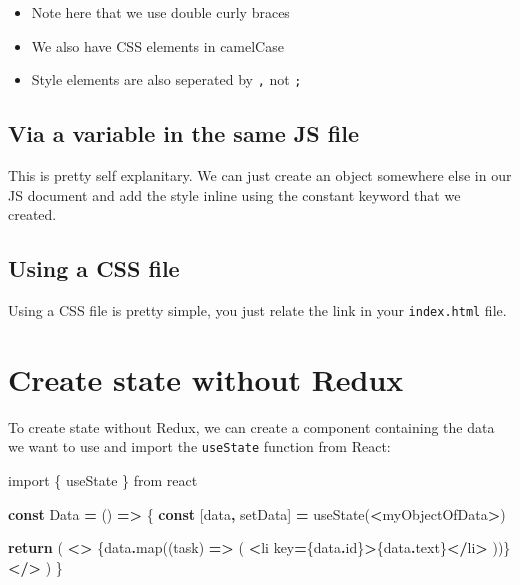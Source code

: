 \documentclass[
]{report}
\newenvironment{Shaded}{\begin{snugshade}}{\end{snugshade}}
\newcommand{\AttributeTok}[1]{\textcolor[rgb]{0.77,0.63,0.00}{#1}}
\newcommand{\ControlFlowTok}[1]{\textcolor[rgb]{0.13,0.29,0.53}{\textbf{#1}}}
\newcommand{\FunctionTok}[1]{\textcolor[rgb]{0.00,0.00,0.00}{#1}}
\newcommand{\ImportTok}[1]{#1}
\newcommand{\KeywordTok}[1]{\textcolor[rgb]{0.13,0.29,0.53}{\textbf{#1}}}
\newcommand{\NormalTok}[1]{#1}
\newcommand{\OperatorTok}[1]{\textcolor[rgb]{0.81,0.36,0.00}{\textbf{#1}}}
\newcommand{\StringTok}[1]{\textcolor[rgb]{0.31,0.60,0.02}{#1}}
\providecommand{\tightlist}{%
  \setlength{\itemsep}{0pt}\setlength{\parskip}{0pt}}
\begin{document}
\begin{itemize}
\tightlist
\item
  Note here that we use double curly braces
\item
  We also have CSS elements in camelCase
\item
  Style elements are also seperated by \texttt{,} not \texttt{;}
\end{itemize}

\hypertarget{via-a-variable-in-the-same-js-file}{%
\section{Via a variable in the same JS file}\label{via-a-variable-in-the-same-js-file}}

This is pretty self explanitary. We can just create an object somewhere else in our JS document and add the style inline using the constant keyword that we created.

\hypertarget{using-a-css-file}{%
\section{Using a CSS file}\label{using-a-css-file}}

Using a CSS file is pretty simple, you just relate the link in your \texttt{index.html} file.

\hypertarget{create-state-without-redux}{%
\chapter{Create state without Redux}\label{create-state-without-redux}}

To create state without Redux, we can create a component containing the data we
want to use and import the \texttt{useState} function from React:

\begin{Shaded}
\begin{Highlighting}[]
\ImportTok{import}\NormalTok{ \{ useState \} }\ImportTok{from} \StringTok{\textquotesingle{}react\textquotesingle{}}

\KeywordTok{const}\NormalTok{ Data }\OperatorTok{=}\NormalTok{ () }\KeywordTok{=\textgreater{}}\NormalTok{ \{}
    \KeywordTok{const}\NormalTok{ [data}\OperatorTok{,}\NormalTok{ setData] }\OperatorTok{=} \FunctionTok{useState}\NormalTok{(}\OperatorTok{\textless{}}\NormalTok{myObjectOfData}\OperatorTok{\textgreater{}}\NormalTok{)}
    
    \ControlFlowTok{return}\NormalTok{ (}
        \OperatorTok{\textless{}\textgreater{}}
\NormalTok{            \{data}\OperatorTok{.}\FunctionTok{map}\NormalTok{((task) }\KeywordTok{=\textgreater{}}\NormalTok{ (}
                \OperatorTok{\textless{}}\NormalTok{li key}\OperatorTok{=}\NormalTok{\{data}\OperatorTok{.}\AttributeTok{id}\NormalTok{\}}\OperatorTok{\textgreater{}}\NormalTok{\{data}\OperatorTok{.}\AttributeTok{text}\NormalTok{\}}\OperatorTok{\textless{}/}\NormalTok{li}\OperatorTok{\textgreater{}}
\NormalTok{            ))\}}
        \OperatorTok{\textless{}/\textgreater{}}
\NormalTok{    )}
\NormalTok{\}}
\end{Highlighting}
\end{Shaded}
\end{document}
